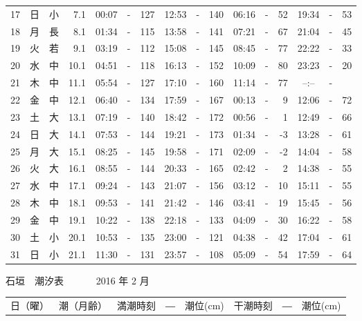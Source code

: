 \documentclass[12pt.a4j]{jsarticle}
\begin{document}
\begin{center}
\begin{table}[ht]
\begin{tabular}{|rc|cr|ccrccr|ccrccr|}
17 & 日 & 小 &  7.1 &  00:07 &-& 127  &  12:53 &-& 140  &   06:16 &-&  52  &   19:34 &-&  53  \\
18 & 月 & 長 &  8.1 &  01:34 &-& 115  &  13:58 &-& 141  &   07:21 &-&  67  &   21:04 &-&  45  \\
19 & 火 & 若 &  9.1 &  03:19 &-& 112  &  15:08 &-& 145  &   08:45 &-&  77  &   22:22 &-&  33  \\
20 & 水 & 中 & 10.1 &  04:51 &-& 118  &  16:13 &-& 152  &   10:09 &-&  80  &   23:23 &-&  20  \\
21 & 木 & 中 & 11.1 &  05:54 &-& 127  &  17:10 &-& 160  &   11:14 &-&  77  &   --:-- &-&     \\
22 & 金 & 中 & 12.1 &  06:40 &-& 134  &  17:59 &-& 167  &   00:13 &-&   9  &   12:06 &-&  72  \\
23 & 土 & 大 & 13.1 &  07:19 &-& 140  &  18:42 &-& 172  &   00:56 &-&   1  &   12:49 &-&  66  \\
24 & 日 & 大 & 14.1 &  07:53 &-& 144  &  19:21 &-& 173  &   01:34 &-&  -3  &   13:28 &-&  61  \\
25 & 月 & 大 & 15.1 &  08:25 &-& 145  &  19:58 &-& 171  &   02:09 &-&  -2  &   14:04 &-&  58  \\
26 & 火 & 大 & 16.1 &  08:55 &-& 144  &  20:33 &-& 165  &   02:42 &-&   2  &   14:38 &-&  55  \\
27 & 水 & 中 & 17.1 &  09:24 &-& 143  &  21:07 &-& 156  &   03:12 &-&  10  &   15:11 &-&  55  \\
28 & 木 & 中 & 18.1 &  09:53 &-& 141  &  21:42 &-& 146  &   03:41 &-&  19  &   15:45 &-&  56  \\
29 & 金 & 中 & 19.1 &  10:22 &-& 138  &  22:18 &-& 133  &   04:09 &-&  30  &   16:22 &-&  58  \\
30 & 土 & 小 & 20.1 &  10:53 &-& 135  &  23:00 &-& 121  &   04:38 &-&  42  &   17:04 &-&  61  \\
31 & 日 & 小 & 21.1 &  11:30 &-& 131  &  23:57 &-& 108  &   05:09 &-&  54  &   17:59 &-&  64  \\
   \hline
   \end{tabular}
\end{table}
\newpage
 {\LARGE 石垣　潮汐表　　　}
 {\large 2016 年  2 月}\\
 \begin{table}[ht]
    \begin{tabular}{|rc|cr|ccrccr|ccrccr|}
    \hline
    \multicolumn{2}{|c|}{日（曜）} & \multicolumn{2}{c|}{潮（月齢）} & \multicolumn{6}{c|}{満潮時刻　―　潮位(cm)} & \multicolumn{6}{c|}{干潮時刻　―　潮位(cm)} \\

\end{tabular}
\end{table}
\end{center}
\end{document}
